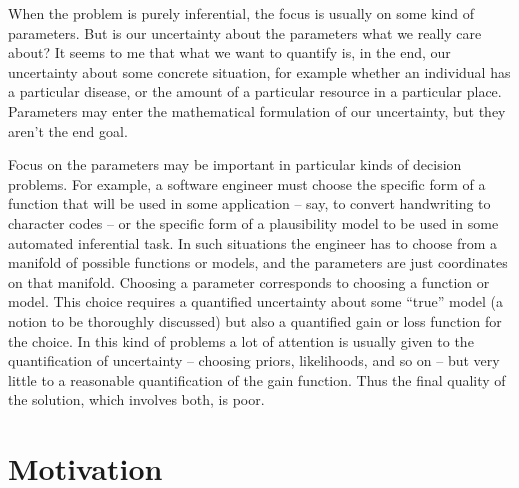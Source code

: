 \documentclass[\ifafour a4paper,12pt,\else a5paper,10pt,\fi%
onecolumn,oneside,article,%
british%
]{memoir}
\theoremstyle{remark}
\theoremstyle{innote}
\renewcommand*{\|}{\mathpunct{|}}
\begin{document}
When the problem is purely inferential, the focus is usually on some kind
of parameters. But is our uncertainty about the parameters what we really
care about? It seems to me that what we want to quantify is, in the end,
our uncertainty about some concrete situation, for example whether an
individual has a particular disease, or the amount of a particular resource
in a particular place. Parameters may enter the mathematical formulation of
our uncertainty, but they aren't the end goal.

Focus on the parameters may be important in particular kinds of decision
problems. For example, a software engineer must choose the specific form of
a function that will be used in some application -- say, to convert
handwriting to character codes -- or the specific form of a plausibility
model to be used in some automated inferential task. In such situations the
engineer has to choose from a manifold of possible functions or models, and
the parameters are just coordinates on that manifold. Choosing a parameter
corresponds to choosing a function or model. This choice requires a
quantified uncertainty about some \enquote{true} model (a notion to be
thoroughly discussed) but also a quantified gain or loss function for the
choice. In this kind of problems a lot of attention is usually given to the
quantification of uncertainty -- choosing priors, likelihoods, and so on --
but very little to a reasonable quantification of the gain function. Thus
the final quality of the solution, which involves both, is poor.





\section{Motivation}
\label{sec:motivation}
\end{document}
